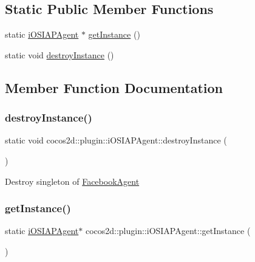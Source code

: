 \subsection*{Static Public Member Functions}
\begin{DoxyCompactItemize}
\item 
static \hyperlink{classcocos2d_1_1plugin_1_1iOSIAPAgent}{i\+O\+S\+I\+A\+P\+Agent} $\ast$ \hyperlink{classcocos2d_1_1plugin_1_1iOSIAPAgent_a09581ef9de6a0e09c4337f25b57ea692}{get\+Instance} ()
\item 
static void \hyperlink{classcocos2d_1_1plugin_1_1iOSIAPAgent_a346611d57e5be374923df34c8792c11f}{destroy\+Instance} ()
\end{DoxyCompactItemize}


\subsection{Member Function Documentation}
\mbox{\label{classcocos2d_1_1plugin_1_1iOSIAPAgent_a346611d57e5be374923df34c8792c11f}} 
\subsubsection{\texorpdfstring{destroy\+Instance()}{destroyInstance()}}
{\footnotesize\ttfamily static void cocos2d\+::plugin\+::i\+O\+S\+I\+A\+P\+Agent\+::destroy\+Instance (\begin{DoxyParamCaption}{ }\end{DoxyParamCaption})\hspace{0.3cm}{\ttfamily [static]}}

Destroy singleton of \hyperlink{classcocos2d_1_1plugin_1_1FacebookAgent}{Facebook\+Agent} \mbox{\label{classcocos2d_1_1plugin_1_1iOSIAPAgent_a09581ef9de6a0e09c4337f25b57ea692}} 
\subsubsection{\texorpdfstring{get\+Instance()}{getInstance()}}
{\footnotesize\ttfamily static \hyperlink{classcocos2d_1_1plugin_1_1iOSIAPAgent}{i\+O\+S\+I\+A\+P\+Agent}$\ast$ cocos2d\+::plugin\+::i\+O\+S\+I\+A\+P\+Agent\+::get\+Instance (\begin{DoxyParamCaption}{ }\end{DoxyParamCaption})\hspace{0.3cm}{\ttfamily [static]}}

